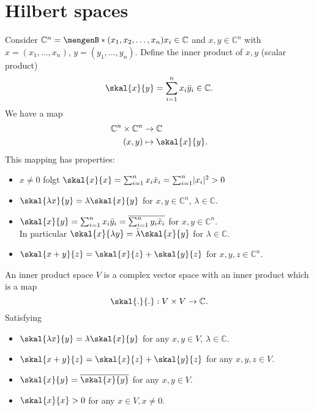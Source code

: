 
\newpage
\section{Hilbert spaces} 
\label{sec:hilbert_spaces}
\begin{beispiel}
	Consider $\mathbb{C}^n = \set[(x_1,x_2,\dots,x_n)]{x_i \in \mathbb{C}}$ and $x,y \in \mathbb{C}^n$ with
	$x= (x_1,\dots,x_n)$, $y = (y_1,\dots,y_n)$. Define the inner product of $x,y$ (scalar product)
	\[
		\skal{x}{y} = \sum^{n}_{i=1}x_i \bar{y}_i \in \mathbb{C}.
	\]
	We have a map
	\begin{align*}
		\mathbb{C}^n \times \mathbb{C}^n &\to \mathbb{C} \\
		(x,y) &\mapsto \skal{x}{y}.
	\end{align*}
	This mapping has properties:
	\begin{itemize}
		\item $x \neq 0$ folgt $\skal{x}{x} = \sum^{n}_{i=1}x_i \bar{x}_i = \sum^{n}_{i=1} \abs{x_i}^2 >0$
		\item $\skal{\lambda x}{y} = \lambda \skal{x}{y}$ for $x,y \in \mathbb{C}^n$, $\lambda \in \mathbb{C}$.
		\item $\skal{x}{y} = \sum^{n}_{i=1} x_i \bar{y}_i = \overline{\sum^{n}_{i=1}y_i \bar{x}_i}$ for $x,y \in \mathbb{C}^n$. \\
		In particular $\skal{x}{\lambda y} = \bar{\lambda} \skal{x}{y}$ for $\lambda \in \mathbb{C}$.
		\item $\skal{x+y}{z} = \skal{x}{z}+ \skal{y}{z}$ for $x,y,z \in \mathbb{C}^n$. 
	\end{itemize}
\end{beispiel}
\begin{definition*}
	An inner product space $V$ is a complex vector space with an inner product which is a map 
	\[
		\skal{.}{.}: V \times V \to \mathbb{C}.
	\]
	Satisfying
	\begin{itemize}
		\item $\skal{\lambda x}{y} = \lambda \skal{x}{y}$ for any $x,y \in V$, $\lambda \in \mathbb{C}$.
		\item $\skal{x+y}{z} = \skal{x}{z}+ \skal{y}{z}$ for any $x,y,z \in V$.
		\item $\skal{x}{y} = \overline{\skal{x}{y}}$ for any $x,y \in V$.
		\item $\skal{x}{x}>0$ for any $x \in V, x \neq 0$.
	\end{itemize}
\end{definition*}
